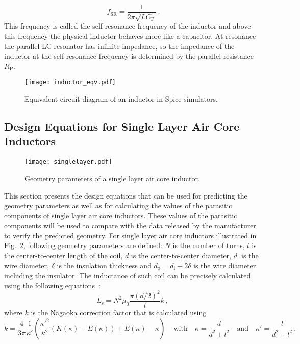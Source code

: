 \begin{equation}\label{eqn:fSRL} \
	f_{\mathrm{SR}} = \frac{1}{2\pi\sqrt{LC_\mathrm{P}}}\,.
\end{equation}
This frequency is called the self-resonance frequency of the inductor and above this frequency the physical inductor  behaves more like a capacitor. At resonance the parallel LC resonator has infinite impedance, so the impedance of the inductor at the self-resonance frequency is determined by the parallel resistance $R_{\mathrm{P}}$.
\begin{figure}[ptb]
	\centering
	\texttt{[image: inductor\_eqv.pdf]}
	\caption{Equivalent circuit diagram of an inductor in Spice simulators.}
	\label{fig:Leqv}
\end{figure}

\subsection{Design Equations for Single Layer Air Core Inductors}
\begin{figure}[ptb]
	\centering
	\texttt{[image: singlelayer.pdf]}
	\caption{Geometry parameters of a single layer air core inductor.}
	\label{fig:air_core}
\end{figure}
This section presents the design equations that can be used for predicting the geometry parameters as well as for calculating the values of the parasitic components of single layer air core inductors. These values ​​of the parasitic components will be used to compare with the data released by the manufacturer to verify the predicted geometry. For single layer air core inductors illustrated in Fig.~\ref{fig:air_core}, following geometry parameters are defined: $N$ is the number of turns, $l$ is the center-to-center length of the coil, $d$ is the center-to-center diameter, $d_\mathrm{i}$ is the wire diameter, $\delta$ is the insulation thickness and $d_\mathrm{o} = d_\mathrm{i}+2\delta$ is the wire diameter including the insulator. The inductance of such coil can be precisely calculated using the following equations~\cite{nagaoka}:
\begin{equation}\label{eqn:aircoil1}
	L_\mathrm{s} = N^2\mu_0\frac{\pi (d/2)^2}{l}k\,,
\end{equation}
where $k$ is the Nagaoka correction factor that is calculated using
\begin{equation}
	k = \frac{4}{3\pi}\frac{1}{\kappa'}\left(\frac{\kappa'^2}{\kappa^2}(K(\kappa)-E(\kappa))+E(\kappa)-\kappa\right)\,
	\quad \text{with} \quad
	\kappa = \frac{d}{d^2+l^2}
	\quad \text{and} \quad
	\kappa' = \frac{l}{d^2+l^2}\,,
\end{equation}
